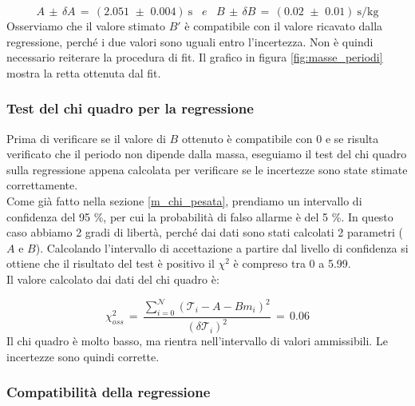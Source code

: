 	\begin{equation*}
		A \,\pm\, \delta A \,=\, (2.051 \,\, \pm \,\, 0.004) \: \si{\second} \,\,\,\,\, e \,\,\,\,\,
		B \,\pm\, \delta B \,=\, (0.02 \,\, \pm \,\, 0.01) \: \si{\second\per\kilo\gram}
	\end{equation*}
    Osserviamo che il valore stimato $B'$ è compatibile con il valore ricavato dalla regressione, perché i due valori
    sono uguali entro l'incertezza. Non è quindi necessario reiterare la procedura di fit.
    Il grafico in figura \ref{fig:masse_periodi} mostra la retta ottenuta dal fit.

\subsubsection{Test del chi quadro per la regressione}

Prima di verificare se il valore di $B$ ottenuto è compatibile con 0 e se risulta verificato che il periodo non dipende dalla massa,
eseguiamo il test del chi quadro sulla regressione appena calcolata per verificare se le incertezze sono state stimate correttamente.\\
%
Come già fatto nella sezione \ref{m_chi_pesata}, prendiamo un intervallo di confidenza del 95 \%, per cui la probabilità di falso allarme
è del 5 \%. In questo caso abbiamo 2 gradi di libertà, perché dai dati sono stati calcolati 2 parametri ($A$ e $B$). Calcolando l'intervallo
di accettazione a partire dal livello di confidenza si ottiene che il risultato del test è positivo il $\chi^2$ è compreso tra 0 a 5.99. \\
%
Il valore calcolato dai dati del chi quadro è:

\begin{equation*}
	\chi_{oss}^2 \,=\, \frac{\sum_{i=0}^{\mathcal{N}} (\mathcal{T}_i - A - Bm_i)^2}{(\delta \mathcal{T}_i)^2} \,=\, 0.06
\end{equation*}
%
Il chi quadro è molto basso, ma rientra nell'intervallo di valori ammissibili. Le incertezze sono quindi corrette.

\subsubsection{Compatibilità della regressione}


